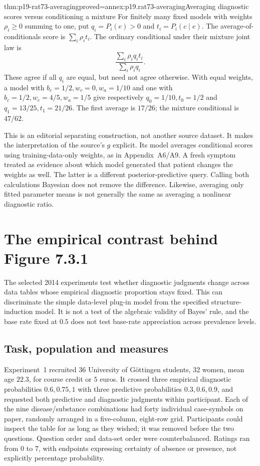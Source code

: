 \begin{hbtheorem}{thm:p19-rat73-averaging}{proved=annex:p19.rat73-averaging}{Averaging diagnostic scores versus conditioning a mixture}
For finitely many fixed models with weights \(\rho_i\geq0\)
summing to one, put \(q_i=P_i(e)>0\) and
\(t_i=P_i(c\mid e)\). The average-of-conditionals score is
\(\sum_i\rho_it_i\). The ordinary conditional under their mixture
joint law is
\[
 \frac{\sum_i\rho_iq_it_i}{\sum_i\rho_iq_i}.
\]
These agree if all \(q_i\) are equal, but need not agree otherwise.
With equal weights, a model with \(b_c=1/2,w_c=0,w_a=1/10\)
and one with \(b_c=1/2,w_c=4/5,w_a=1/5\) give respectively
\(q_0=1/10,t_0=1/2\) and \(q_1=13/25,t_1=21/26\).
The first average is \(17/26\); the mixture conditional is \(47/62\).
\end{hbtheorem}

This is an editorial separating construction, not another source dataset.
It makes the interpretation of the source's \(g\) explicit. Its model
averages conditional scores using training-data-only weights, as in
Appendix~A6/A9. A fresh symptom treated as evidence about which model
generated that patient changes the weights as well. The latter is a
different posterior-predictive query. Calling both calculations Bayesian
does not remove the difference. Likewise, averaging only fitted parameter
means is not generally the same as averaging a nonlinear diagnostic ratio.

\section{The empirical contrast behind Figure 7.3.1}
\label{sec:p19-rat73-evidence}

The selected 2014 experiments test whether diagnostic judgments change
across data tables whose empirical diagnostic proportion stays fixed.
This can discriminate the simple data-level plug-in model from the
specified structure-induction model. It is not a test of the algebraic
validity of Bayes' rule, and the base rate fixed at \(0.5\) does not test
base-rate appreciation across prevalence levels.
\cite[pp.~278, 284--293]{MederMayrhoferWaldmann2014StructureInduction}

\subsection{Task, population and measures}

Experiment~1 recruited 36 University of G\"ottingen students,
32 women, mean age \(22.3\), for course credit or \(5\) euros.
It crossed three empirical diagnostic probabilities \(0.6,0.75,1\)
with three predictive probabilities \(0.3,0.6,0.9\), and requested
both predictive and diagnostic judgments within participant. Each of the
nine disease/substance combinations had forty individual case-symbols
on paper, randomly arranged in a five-column, eight-row grid. Participants
could inspect the table for as long as they wished; it was removed before
the two questions. Question order and data-set order were counterbalanced.
Ratings ran from \(0\) to \(7\), with endpoints expressing certainty
of absence or presence, not explicitly percentage probability.
\cite[pp.~284--285]{MederMayrhoferWaldmann2014StructureInduction}

